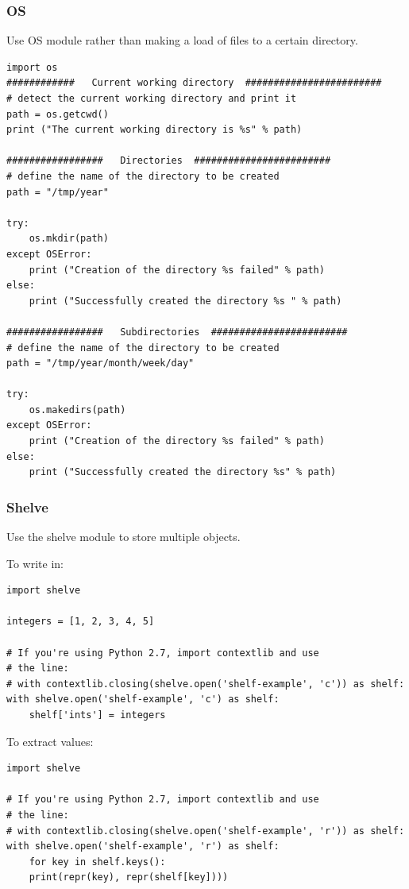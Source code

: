 \documentclass[11pt]{article}
\begin{document}
\subsubsection{OS}
\label{sec:org3aabac0}
Use OS module rather than making a load of files to a certain directory. 
\begin{verbatim}
import os
############   Current working directory  ########################
# detect the current working directory and print it
path = os.getcwd()  
print ("The current working directory is %s" % path) 

#################   Directories  ########################
# define the name of the directory to be created
path = "/tmp/year"

try:  
    os.mkdir(path)
except OSError:  
    print ("Creation of the directory %s failed" % path)
else:  
    print ("Successfully created the directory %s " % path)

#################   Subdirectories  ########################
# define the name of the directory to be created
path = "/tmp/year/month/week/day"

try:  
    os.makedirs(path)
except OSError:  
    print ("Creation of the directory %s failed" % path)
else:  
    print ("Successfully created the directory %s" % path)
\end{verbatim}
\subsubsection{Shelve}
\label{sec:org4dd50a6}
Use the shelve module to store multiple objects. 

To write in:
\begin{verbatim}
import shelve

integers = [1, 2, 3, 4, 5]

# If you're using Python 2.7, import contextlib and use
# the line:
# with contextlib.closing(shelve.open('shelf-example', 'c')) as shelf:
with shelve.open('shelf-example', 'c') as shelf:
    shelf['ints'] = integers
\end{verbatim}

To extract values:
\begin{verbatim}
import shelve

# If you're using Python 2.7, import contextlib and use
# the line:
# with contextlib.closing(shelve.open('shelf-example', 'r')) as shelf:
with shelve.open('shelf-example', 'r') as shelf:
    for key in shelf.keys():
	print(repr(key), repr(shelf[key])))
\end{verbatim}
\end{document}
